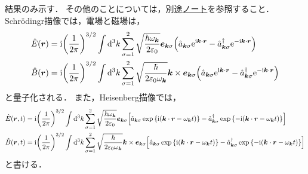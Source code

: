 \documentclass{report}
\begin{document}
  結果のみ示す．
  その他のことについては，別途\href{https://github.com/YutoMSD/physics_notes/blob/main/qft/main.pdf}{ノート}を参照すること．
  Schr\"odingr描像では，電場と磁場は，
  \begin{align}
    \hat{E}(\bm{r}) &= \mathrm{i}\qty(\frac{1}{2\pi})^{3/2}\int\dd[3]{k}\sum_{\sigma = 1}^{2}\sqrt{\frac{\hbar\omega_{\bm{k}}}{2\varepsilon_0}}\bm{e}_{\bm{k}\sigma}\qty(\hat{a}_{\bm{k}\sigma}\mathrm{e}^{\mathrm{i}\bm{k}\cdot\bm{r}} - \hat{a}_{\bm{k}\sigma}^{\dag}\mathrm{e}^{-\mathrm{i}\bm{k}\cdot\bm{r}}) \\ 
    \hat{B}(\bm{r}) &= \mathrm{i}\qty(\frac{1}{2\pi})^{3/2}\int\dd[3]{k}\sum_{\sigma = 1}^{2}\sqrt{\frac{\hbar}{2\varepsilon_0\omega_{\bm{k}}}}\bm{k}\times\bm{e}_{\bm{k}\sigma}\qty(\hat{a}_{\bm{k}\sigma}\mathrm{e}^{\mathrm{i}\bm{k}\cdot\bm{r}} - \hat{a}_{\bm{k}\sigma}^{\dag}\mathrm{e}^{-\mathrm{i}\bm{k}\cdot\bm{r}}) 
  \end{align}
  と量子化される．
  また，Heisenberg描像では，
  \begin{align}
    \hat{E}(\bm{r}, t) &= \mathrm{i}\qty(\frac{1}{2\pi})^{3/2}\int\dd[3]{k}\sum_{\sigma = 1}^{2}\sqrt{\frac{\hbar\omega_{\bm{k}}}{2\varepsilon_0}}\bm{e}_{\bm{k}\sigma}\qty[\hat{a}_{\bm{k}\sigma}\exp\qty{\mathrm{i}\qty(\bm{k}\cdot\bm{r} - \omega_{\bm{k}}t)} - \hat{a}_{\bm{k}\sigma}^{\dag}\exp\qty{-\mathrm{i}\qty(\bm{k}\cdot\bm{r} - \omega_{\bm{k}}t)}] \\ 
    \hat{B}(\bm{r}, t) &= \mathrm{i}\qty(\frac{1}{2\pi})^{3/2}\int\dd[3]{k}\sum_{\sigma = 1}^{2}\sqrt{\frac{\hbar}{2\varepsilon_0\omega_{\bm{k}}}}\bm{k}\times\bm{e}_{\bm{k}\sigma}\qty[\hat{a}_{\bm{k}\sigma}\exp\qty{\mathrm{i}\qty(\bm{k}\cdot\bm{r} - \omega_{\bm{k}}t)} - \hat{a}_{\bm{k}\sigma}^{\dag}\exp\qty{-\mathrm{i}\qty(\bm{k}\cdot\bm{r} - \omega_{\bm{k}}t)}]
  \end{align}
  と書ける．
\end{document}
